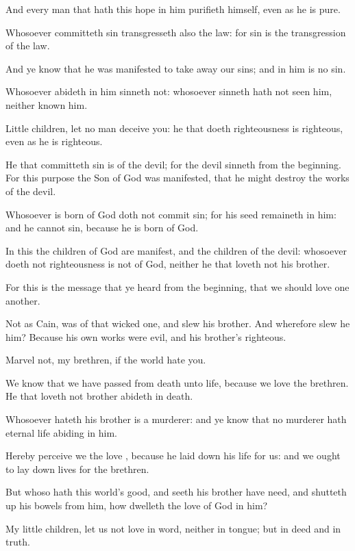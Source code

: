 {And every
man that
hath
this
hope
in
him
purifieth
himself, even
as
he
is
pure.

Whosoever
committeth
sin
transgresseth
also the
law:
for
sin
is the transgression of the
law.

And ye
know
that
he was
manifested
to take
away
our
sins;
and
in
him
is
no
sin.

Whosoever
abideth
in
him
sinneth
not:
whosoever
sinneth
hath
not
seen
him,
neither
known
him.

Little
children,
let no
man
deceive
you: he that
doeth
righteousness
is
righteous, even
as
he
is
righteous.

He that
committeth
sin
is
of the
devil;
for the
devil
sinneth
from the
beginning.
For this
purpose the
Son of
God was
manifested,
that he might
destroy the
works of the
devil.

Whosoever is
born
of
God
doth
not
commit
sin;
for
his
seed
remaineth
in
him:
and he
cannot
sin,
because he is
born
of
God.

In
this the
children of
God
are
manifest,
and the
children of the
devil:
whosoever
doeth
not
righteousness
is
not
of
God,
neither he that
loveth
not
his
brother.

For
this
is the
message
that ye
heard
from the
beginning,
that we should
love one
another.

Not
as
Cain,
{}
was
of that wicked
one,
and
slew
his
brother.
And
wherefore slew
he
him?
Because his
own
works
were
evil,
and
his
brother’s
righteous.


\par }{\PP {}Marvel
not,
my
brethren,
if the
world
hate
you.

We
know
that we have
passed
from
death
unto
life,
because we
love the
brethren. He that
loveth
not
{}
brother
abideth
in
death.

Whosoever
hateth
his
brother
is a
murderer:
and ye
know
that
no
murderer
hath
eternal
life
abiding
in
him.

Hereby perceive
we the
love
{},
because
he laid
down
his
life
for
us:
and
we
ought to lay
down
{}
lives
for the
brethren.

But
whoso
hath this
world’s
good,
and
seeth
his
brother
have
need,
and shutteth
up
his
bowels
{}
from
him,
how
dwelleth the
love of
God
in
him?

My little
children, let
us
not
love in
word,
neither in
tongue;
but in
deed
and in
truth.

}
